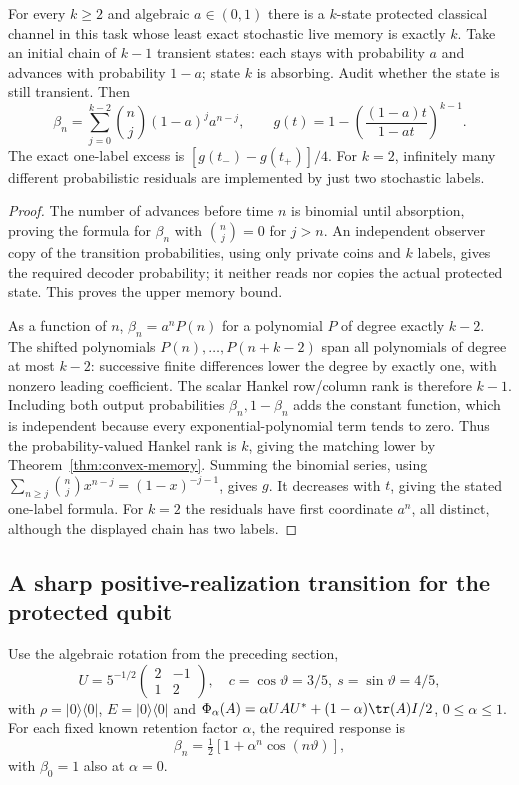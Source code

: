 \begin{theorem}\label{thm:calibration-k}
For every $k\ge2$ and algebraic $a\in(0,1)$ there is a $k$-state protected classical channel in this task whose least exact stochastic live memory is exactly $k$. Take an initial chain of $k-1$ transient states: each stays with probability $a$ and advances with probability $1-a$; state $k$ is absorbing. Audit whether the state is still transient. Then
\begin{equation}\label{eq:phase-survival}
 \beta_n=\sum_{j=0}^{k-2}\binom nj(1-a)^j a^{n-j},\qquad
 g(t)=1-\left(\frac{(1-a)t}{1-at}\right)^{k-1}.
\end{equation}
The exact one-label excess is $[g(t_-)-g(t_+)]/4$. For $k=2$, infinitely many different probabilistic residuals are implemented by just two stochastic labels.
\end{theorem}
\begin{proof}
The number of advances before time $n$ is binomial until absorption, proving the formula for $\beta_n$ with $\binom nj=0$ for $j>n$. An independent observer copy of the transition probabilities, using only private coins and $k$ labels, gives the required decoder probability; it neither reads nor copies the actual protected state. This proves the upper memory bound.

As a function of $n$, $\beta_n=a^nP(n)$ for a polynomial $P$ of degree exactly $k-2$. The shifted polynomials $P(n),\ldots,P(n+k-2)$ span all polynomials of degree at most $k-2$: successive finite differences lower the degree by exactly one, with nonzero leading coefficient. The scalar Hankel row/column rank is therefore $k-1$. Including both output probabilities $\beta_n,1-\beta_n$ adds the constant function, which is independent because every exponential-polynomial term tends to zero. Thus the probability-valued Hankel rank is $k$, giving the matching lower by Theorem~\ref{thm:convex-memory}. Summing the binomial series, using $\sum_{n\ge j}\binom nj x^{n-j}=(1-x)^{-j-1}$, gives $g$. It decreases with $t$, giving the stated one-label formula. For $k=2$ the residuals have first coordinate $a^n$, all distinct, although the displayed chain has two labels.
\end{proof}

\subsection{A sharp positive-realization transition for the protected qubit}
Use the algebraic rotation from the preceding section,
\[
 U=5^{-1/2}\begin{pmatrix}2&-1\\1&2\end{pmatrix},\quad
 c=\cos\vartheta=3/5,\ s=\sin\vartheta=4/5,
\]
with $\rho=|0\rangle\langle0|$, $E=|0\rangle\langle0|$ and
$\Phi_\alpha(A)=\alpha UAU^*+(1-\alpha)\tr(A)I/2$, $0\le\alpha\le1$.
For each fixed known retention factor $\alpha$, the required response is
\begin{equation}\label{eq:damped-born}
 \beta_n=\tfrac12[1+\alpha^n\cos(n\vartheta)],
\end{equation}
with $\beta_0=1$ also at $\alpha=0$.

